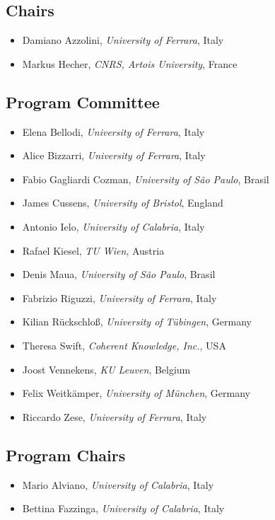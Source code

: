 \documentclass[
]{ceurart}
\begin{document}

\subsection*{Chairs}
\begin{itemize}
  \item Damiano Azzolini, \emph{University of Ferrara}, Italy
  \item Markus Hecher, \emph{CNRS, Artois University}, France
\end{itemize}


\subsection*{Program Committee}
\begin{itemize}
  \item Elena Bellodi, \emph{University of Ferrara}, Italy
  \item Alice Bizzarri, \emph{University of Ferrara}, Italy
  \item Fabio Gagliardi Cozman, \emph{University of São Paulo}, Brasil
  \item James Cussens, \emph{University of Bristol}, England
  \item Antonio Ielo, \emph{University of Calabria}, Italy
  \item Rafael Kiesel, \emph{TU Wien}, Austria
  \item Denis Maua, \emph{University of São Paulo}, Brasil
  \item Fabrizio Riguzzi, \emph{University of Ferrara}, Italy
  \item Kilian Rückschloß, \emph{University of Tübingen}, Germany
  \item Theresa Swift, \emph{Coherent Knowledge, Inc.}, USA
  \item Joost Vennekens, \emph{KU Leuven}, Belgium
  \item Felix Weitkämper, \emph{University of München}, Germany
  \item Riccardo Zese, \emph{University of Ferrara}, Italy
\end{itemize}


\subsection*{Program Chairs}
\begin{itemize}
  \item Mario Alviano, \emph{University of Calabria}, Italy
  \item Bettina Fazzinga, \emph{University of Calabria}, Italy
\end{itemize}
\end{document}
